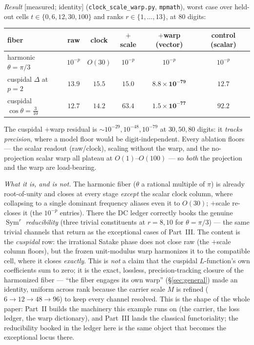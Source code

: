 \documentclass[11pt]{article}
\theoremstyle{definition}
\newcommand{\Sym}{\operatorname{Sym}}
\begin{document}
\emph{Result} \textup{[measured; identity]} (\texttt{clock\_scale\_warp.py}, \texttt{mpmath}), worst case over
held-out cells $t\in\{0,6,12,30,100\}$ and ranks $r\in\{1,\dots,13\}$, at $80$ digits:
\begin{center}
\begin{tabular}{lccccc}
\toprule
fiber & raw & clock & $+$scale & $+$warp (vector) & control (scalar) \\
\midrule
harmonic $\theta=\pi/3$ & $10^{-p}$ & $O(30)$ & $10^{-p}$ & $10^{-p}$ & $10^{-p}$ \\
cuspidal $\Delta$ at $p{=}2$ & $13.9$ & $15.5$ & $15.0$ & $\mathbf{8.8\times10^{-79}}$ & $12.7$ \\
cuspidal $\cos\theta=\tfrac{3}{10}$ & $12.7$ & $14.2$ & $63.4$ & $\mathbf{1.5\times10^{-77}}$ & $92.2$ \\
\bottomrule
\end{tabular}
\end{center}
The cuspidal $+$warp residual is $\sim10^{-29},10^{-48},10^{-79}$ at $30,50,80$ digits: it \emph{tracks
precision}, where a model floor would be digit-independent. Every ablation floors --- the scalar readout
(raw/clock), scaling without the warp, and the no-projection scalar warp all plateau at $O(1)$--$O(100)$ --- so
\emph{both} the projection and the warp are load-bearing.

\emph{What it is, and is not.} The harmonic fiber ($\theta$ a rational multiple of $\pi$) is already
root-of-unity and closes at every stage \emph{except} the scalar clock column, where collapsing to a single
dominant frequency aliases even it to $O(30)$; $+$scale re-closes it (the $10^{-p}$ entries). There the DC ledger
correctly books the genuine $\Sym^r$
\emph{reducibility} (three trivial constituents at $r=8,10$ for $\theta=\pi/3$) --- the same trivial channels
that return as the exceptional cases of Part~III. The content is the \emph{cuspidal} row: the irrational Satake
phase does not close raw (the $+$scale column floors), but the frozen unit-modulus warp harmonizes it to the
compatible cell, where it closes \emph{exactly}. This is \emph{not} a claim that the cuspidal $L$-function's own
coefficients sum to zero; it is the exact, lossless, precision-tracking closure of the harmonized fiber ---
``the fiber engages its own warp'' (\S\ref{sec:general}) made an identity, uniform across rank because the
carrier scale $M$ is refined ($6\to12\to48\to96$) to keep every channel resolved. This is the shape of the
whole paper: Part~II builds the machinery this example runs on (the carrier, the loss ledger, the warp
dictionary), and Part~III lands the classical functoriality; the reducibility booked in the ledger here is the
same object that becomes the exceptional locus there.
\end{document}
